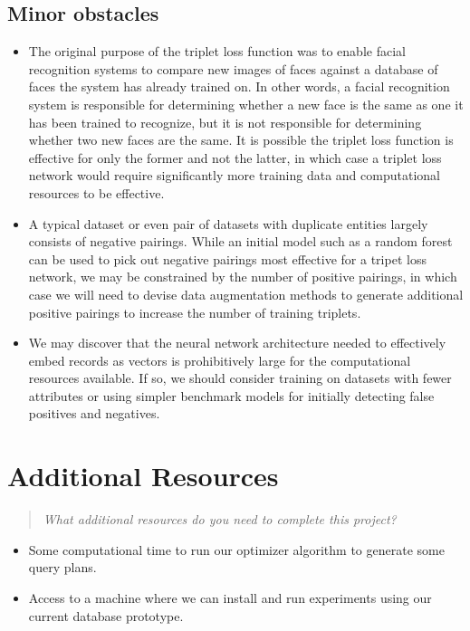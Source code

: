 \documentclass{proc}
\begin{document}
\subsection{Minor obstacles}

\begin{itemize}
  \item The original purpose of the triplet loss function was to enable facial recognition systems to compare new images of faces against a database of faces the system has already trained on. In other words, a facial recognition system is responsible for determining whether a new face is the same as one it has been trained to recognize, but it is not responsible for determining whether two new faces are the same. It is possible the triplet loss function is effective for only the former and not the latter, in which case a triplet loss network would require significantly more training data and computational resources to be effective.
  \item A typical dataset or even pair of datasets with duplicate entities largely consists of negative pairings. While an initial model such as a random forest can be used to pick out negative pairings most effective for a tripet loss network, we may be constrained by the number of positive pairings, in which case we will need to devise data augmentation methods to generate additional positive pairings to increase the number of training triplets.
  \item We may discover that the neural network architecture needed to effectively embed records as vectors is prohibitively large for the computational resources available. If so, we should consider training on datasets with fewer attributes or using simpler benchmark models for initially detecting false positives and negatives.
\end{itemize}


\section{Additional Resources}
\begin{quote}
\emph{What additional resources do you need to complete this project?}
\end{quote}

\begin{itemize}
  \item Some computational time to run our optimizer algorithm to generate some query plans.
  \item Access to a machine where we can install and run experiments using our current database prototype.
 \end{itemize}
 
\end{document}
